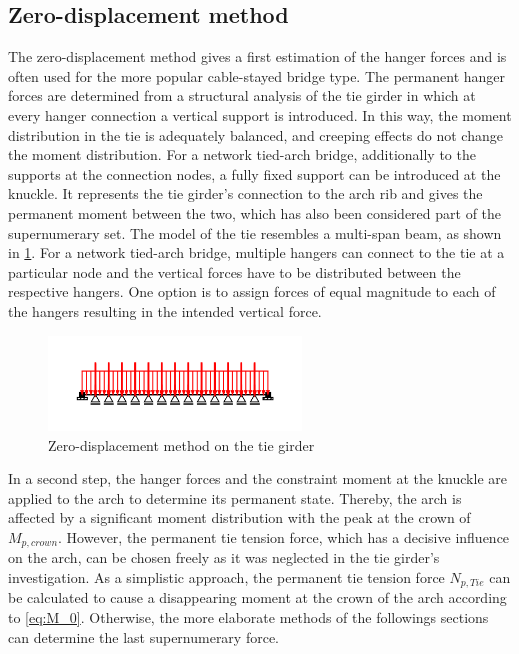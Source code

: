 \subsection{Zero-displacement method}
The zero-displacement method gives a first estimation of the hanger forces and is often used for the more popular cable-stayed bridge type. The permanent hanger forces are determined from a structural analysis of the tie girder in which at every hanger connection a vertical support is introduced. In this way, the moment distribution in the tie is adequately balanced, and creeping effects do not change the moment distribution. For a network tied-arch bridge, additionally to the supports at the connection nodes, a fully fixed support can be introduced at the knuckle. It represents the tie girder's connection to the arch rib and gives the permanent moment between the two, which has also been considered part of the supernumerary set. The model of the tie resembles a multi-span beam, as shown in \cref{fig:zero_disp}. For a network tied-arch bridge, multiple hangers can connect to the tie at a particular node and the vertical forces have to be distributed between the respective hangers. One option is to assign forces of equal magnitude to each of the hangers resulting in the intended vertical force. 

\begin{figure}[H]
    \centering
    \includegraphics[trim={0 1cm 0 1cm},clip,width=0.6\textwidth]{illustrations/optimisation methods/zero-displacement.png}
    \caption{Zero-displacement method on the tie girder}
    \label{fig:zero_disp}
\end{figure}

In a second step, the hanger forces and the constraint moment at the knuckle are applied to the arch to determine its permanent state. Thereby, the arch is affected by a significant moment distribution with the peak at the crown of $M_{p,crown}$. However, the permanent tie tension force, which has a decisive influence on the arch, can be chosen freely as it was neglected in the tie girder's investigation. As a simplistic approach, the permanent tie tension force $N_{p,Tie}$ can be calculated to cause a disappearing moment at the crown of the arch according to \cref{eq:M_0}. Otherwise, the more elaborate methods of the followings sections can determine the last supernumerary force.

